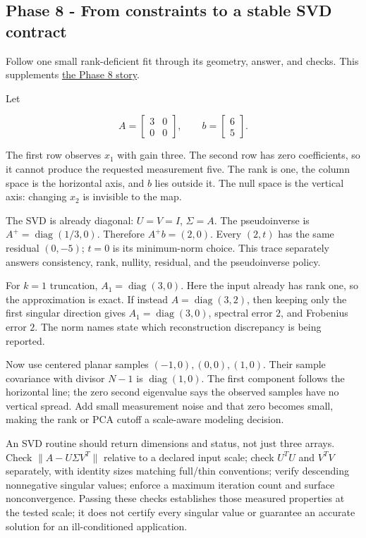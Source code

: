 \subsection{Phase 8 - From constraints to a stable SVD contract}\label{appendix-92ff77d4dfdc-phase-8---from-constraints-to-a-stable-svd-contract}

Follow one small rank-deficient fit through its geometry, answer, and checks. This supplements \hyperref[01-foundations-i-ch019-the-graphics-problem-hiding-inside-a-matrix-equation]{the Phase 8 story}.

Let

\[
A=\begin{bmatrix}3&0\\0&0\end{bmatrix},\qquad
b=\begin{bmatrix}6\\5\end{bmatrix}.
\]

The first row observes \(x_1\) with gain three. The second row has zero coefficients, so it cannot produce the requested measurement five. The rank is one, the column space is the horizontal axis, and \(b\) lies outside it. The null space is the vertical axis: changing \(x_2\) is invisible to the map.

The SVD is already diagonal: \(U=V=I\), \(\Sigma=A\). The pseudoinverse is \(A^+=\operatorname{diag}(1/3,0)\). Therefore \(A^+b=(2,0)\). Every \((2,t)\) has the same residual \((0,-5)\); \(t=0\) is its minimum-norm choice. This trace separately answers consistency, rank, nullity, residual, and the pseudoinverse policy.

For \(k=1\) truncation, \(A_1=\operatorname{diag}(3,0)\). Here the input already has rank one, so the approximation is exact. If instead \(A=\operatorname{diag}(3,2)\), then keeping only the first singular direction gives \(A_1=\operatorname{diag}(3,0)\), spectral error \(2\), and Frobenius error \(2\). The norm names state which reconstruction discrepancy is being reported.

Now use centered planar samples \((-1,0),(0,0),(1,0)\). Their sample covariance with divisor \(N-1\) is \(\operatorname{diag}(1,0)\). The first component follows the horizontal line; the zero second eigenvalue says the observed samples have no vertical spread. Add small measurement noise and that zero becomes small, making the rank or PCA cutoff a scale-aware modeling decision.

An SVD routine should return dimensions and status, not just three arrays. Check \(\|A-U\Sigma V^T\|\) relative to a declared input scale; check \(U^TU\) and \(V^TV\) separately, with identity sizes matching full/thin conventions; verify descending nonnegative singular values; enforce a maximum iteration count and surface nonconvergence. Passing these checks establishes those measured properties at the tested scale; it does not certify every singular value or guarantee an accurate solution for an ill-conditioned application.

